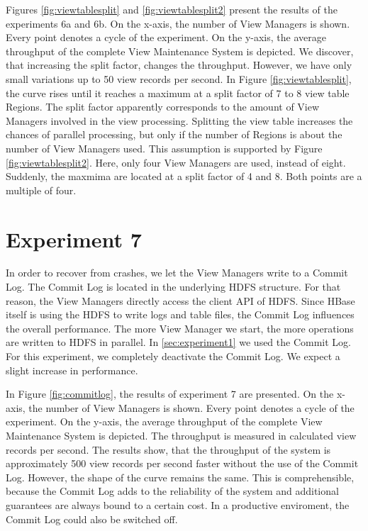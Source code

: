 \documentclass[11pt,a4paper,bibtotoc,idxtotoc,headsepline,footsepline,footexclude,BCOR12mm,DIV13]{scrbook}
\begin{document}
Figures \ref{fig:viewtablesplit} and \ref{fig:viewtablesplit2} present the results of the experiments 6a and 6b. On the x-axis, the number of View Managers is shown. Every point denotes a cycle of the experiment. On the y-axis, the average throughput of the complete View Maintenance System is depicted. We discover, that increasing the split factor, changes the throughput. However, we have only small variations up to 50 view records per second. In Figure \ref{fig:viewtablesplit}, the curve rises until it reaches a maximum at a split factor of 7 to 8 view table Regions. The split factor apparently corresponds to the amount of View Managers involved in the view processing. Splitting the view table increases the chances of parallel processing, but only if the number of Regions is about the number of View Managers used. This assumption is supported by Figure \ref{fig:viewtablesplit2}. Here, only four View Managers are used, instead of eight. Suddenly, the maxmima are located at a split factor of 4 and 8. Both points are a multiple of four.


\section{Experiment 7}
\label{sec:experiment7}


In order to recover from crashes, we let the View Managers write to a Commit Log. The Commit Log is located in the underlying HDFS structure. For that reason, the View Managers directly access the client API of HDFS. Since HBase itself is using the HDFS to write logs and table files, the Commit Log influences the overall performance. The more View Manager we start, the more operations are written to HDFS in parallel. In \ref{sec:experiment1} we used the Commit Log. For this experiment, we completely deactivate the Commit Log. We expect a slight increase in performance. 


In Figure \ref{fig:commitlog}, the results of experiment 7 are presented.  On the x-axis, the number of View Managers is shown. Every point denotes a cycle of the experiment. On the y-axis, the average throughput of the complete View Maintenance System is depicted. The throughput is measured in calculated view records per second. The results show, that the throughput of the system is approximately 500 view records per second faster without the use of the Commit Log. However, the shape of the curve remains the same. This is comprehensible, because the Commit Log adds to the reliability of the system and additional guarantees are always bound to a certain cost. In a productive enviroment, the Commit Log could also be switched off.
\end{document}
